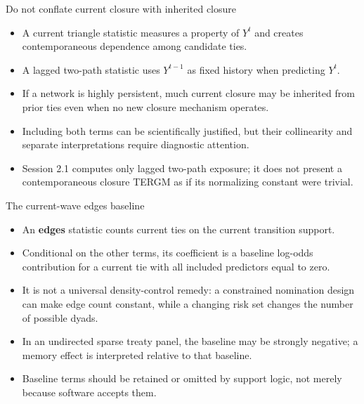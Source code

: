 \documentclass[aspectratio=169,11pt]{beamer}
\newcommand{\term}[1]{\textbf{\color{nupurple}#1}}
\begin{document}
\begin{frame}{Do not conflate current closure with inherited closure}
\begin{itemize}
\item A current triangle statistic measures a property of $Y^t$ and creates contemporaneous dependence among candidate ties.
\item A lagged two-path statistic uses $Y^{t-1}$ as fixed history when predicting $Y^t$.
\item If a network is highly persistent, much current closure may be inherited from prior ties even when no new closure mechanism operates.
\item Including both terms can be scientifically justified, but their collinearity and separate interpretations require diagnostic attention.
\item Session 2.1 computes only lagged two-path exposure; it does not present a contemporaneous closure TERGM as if its normalizing constant were trivial.
\end{itemize}
\end{frame}

\begin{frame}{The current-wave edges baseline}
\begin{itemize}
\item An \term{edges} statistic counts current ties on the current transition support.
\item Conditional on the other terms, its coefficient is a baseline log-odds contribution for a current tie with all included predictors equal to zero.
\item It is not a universal density-control remedy: a constrained nomination design can make edge count constant, while a changing risk set changes the number of possible dyads.
\item In an undirected sparse treaty panel, the baseline may be strongly negative; a memory effect is interpreted relative to that baseline.
\item Baseline terms should be retained or omitted by support logic, not merely because software accepts them.
\end{itemize}
\end{frame}
\end{document}
